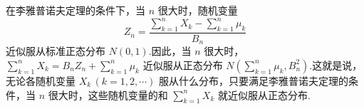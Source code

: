 在李雅普诺夫定理的条件下，当 $n$ 很大时，随机变量
$$
Z_n = \dfrac{\displaystyle\sum_{k=1}^n X_k - \displaystyle\sum_{k=1}^n \mu_k}{B_n}
$$
近似服从标准正态分布 $N(0,1)$.因此，当 $n$ 很大时，$\displaystyle\sum_{k=1}^n X_k = B_n Z_n + \displaystyle\sum_{k=1}^n \mu_k$ 近似服从正态分布 $N(\displaystyle\sum_{k=1}^n \mu_k, B_n^2)$.这就是说，无论各随机变量 $X_k \, (k=1,2,\cdots)$ 服从什么分布，只要满足李雅普诺夫定理的条件，当 $n$ 很大时，这些随机变量的和 $\displaystyle\sum_{k=1}^n X_k$ 就近似服从正态分布.